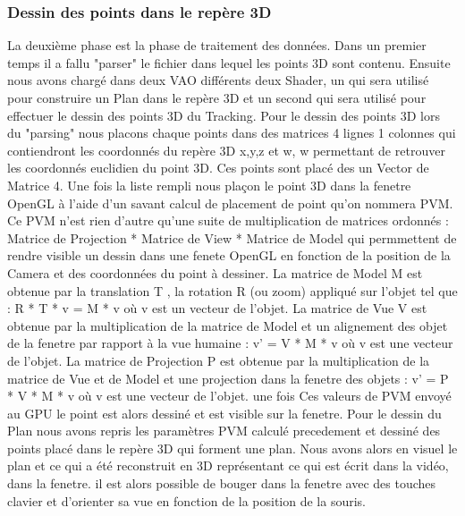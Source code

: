 \subsubsection{Dessin des points dans le repère 3D}
La deuxième phase est la phase de traitement des données. Dans un premier temps il a fallu "parser" le fichier dans lequel les points 3D sont contenu. Ensuite nous avons chargé dans deux VAO différents deux Shader, un qui sera utilisé pour construire un Plan dans le repère 3D et un second qui sera utilisé pour effectuer le dessin des points 3D du Tracking. Pour le dessin des points 3D lors du "parsing" nous placons chaque points dans des matrices 4 lignes 1 colonnes qui contiendront les coordonnés du repère 3D x,y,z et w, w permettant de retrouver les coordonnés euclidien du point 3D. Ces points sont placé des un Vector de Matrice 4. Une fois la liste rempli nous plaçon le point 3D dans la fenetre OpenGL à l'aide d'un savant calcul de placement de point qu'on nommera PVM. Ce PVM n'est rien d'autre qu'une suite de multiplication de matrices ordonnés : Matrice de Projection * Matrice de View * Matrice de Model qui permmettent de rendre visible un dessin dans une fenete OpenGL en fonction de la position de la Camera et des coordonnées du point à dessiner.
La matrice de Model M est obtenue par la translation T , la rotation R (ou zoom) appliqué sur l'objet tel que : R * T * v = M * v où v est un vecteur de l'objet.
La matrice de Vue V est obtenue par la multiplication de la matrice de Model et un alignement des objet de la fenetre par rapport à la vue humaine : v' = V * M * v où v est une vecteur de l'objet.
La matrice de Projection P est obtenue par la multiplication de la matrice de Vue et de Model et une projection dans la fenetre des objets : v' = P * V * M * v où v est une vecteur de l'objet.
une fois Ces valeurs de PVM envoyé au GPU le point est alors dessiné et est visible sur la fenetre.
Pour le dessin du Plan nous avons repris les paramètres PVM calculé precedement et dessiné des points placé dans le repère 3D qui forment une plan.
Nous avons alors en visuel le plan et ce qui a été reconstruit en 3D représentant ce qui est écrit dans la vidéo, dans la fenetre. il est alors possible de bouger dans la fenetre avec des touches clavier et d'orienter sa vue en fonction de la position de la souris.
